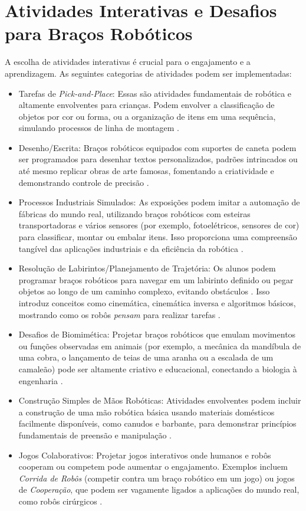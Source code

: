 \documentclass[%
  12pt,%
  a4paper,%
  oneside,%
  openright,%
  sumario = abnt-6027-2012,%
  chapter = TITLE,%
  pretextualoneside,%
  fontetimes,%
  semrecuonosumario,%
  usemakeindex,%
  pardeassinaturas,%
  english,%
  french,%
  spanish,%
  brazil,%
]{utfpr}%
\begin{document}
\section{Atividades Interativas e Desafios para Braços Robóticos}
A escolha de atividades interativas é crucial para o engajamento e a aprendizagem. As seguintes categorias de atividades podem ser implementadas:
	\begin{itemize}
		\item Tarefas de \emph{Pick-and-Place}: Essas são atividades fundamentais de robótica e altamente envolventes para crianças. Podem envolver a classificação de objetos por cor ou forma, ou a organização de itens em uma sequência, simulando processos de linha de montagem \cite{robotlabDobotClassroomPack2025}.
		\item Desenho/Escrita: Braços robóticos equipados com suportes de caneta podem ser programados para desenhar textos personalizados, padrões intrincados ou até mesmo replicar obras de arte famosas, fomentando a criatividade e demonstrando controle de precisão \cite{centrePointRoboticsGames2025}.
		\item Processos Industriais Simulados: As exposições podem imitar a automação de fábricas do mundo real, utilizando braços robóticos com esteiras transportadoras e vários sensores (por exemplo, fotoelétricos, sensores de cor) para classificar, montar ou embalar itens. Isso proporciona uma compreensão tangível das aplicações industriais e da eficiência da robótica \cite{robotlabDobotClassroomPack2025}.
		\item Resolução de Labirintos/Planejamento de Trajetória: Os alunos podem programar braços robóticos para navegar em um labirinto definido ou pegar objetos ao longo de um caminho complexo, evitando obstáculos \cite{rancholabsUltimateGuide2025}. Isso introduz conceitos como cinemática, cinemática inversa e algoritmos básicos, mostrando como os robôs \emph{pensam} para realizar tarefas \cite{chang2025ConstructedResponse}.
		\item Desafios de Biomimética: Projetar braços robóticos que emulam movimentos ou funções observadas em animais (por exemplo, a mecânica da mandíbula de uma cobra, o lançamento de teias de uma aranha ou a escalada de um camaleão) pode ser altamente criativo e educacional, conectando a biologia à engenharia \cite{ross2024BeyondExhibits}. 
		\item Construção Simples de Mãos Robóticas: Atividades envolventes podem incluir a construção de uma mão robótica básica usando materiais domésticos facilmente disponíveis, como canudos e barbante, para demonstrar princípios fundamentais de preensão e manipulação \cite{scienceBuddiesRoboticsProjects2025}.
		\item Jogos Colaborativos: Projetar jogos interativos onde humanos e robôs cooperam ou competem pode aumentar o engajamento. Exemplos incluem \emph{Corrida de Robôs} (competir contra um braço robótico em um jogo) ou jogos de \emph{Cooperação}, que podem ser vagamente ligados a aplicações do mundo real, como robôs cirúrgicos \cite{centrePointRoboticsGames2025}.
	\end{itemize}
\end{document}
